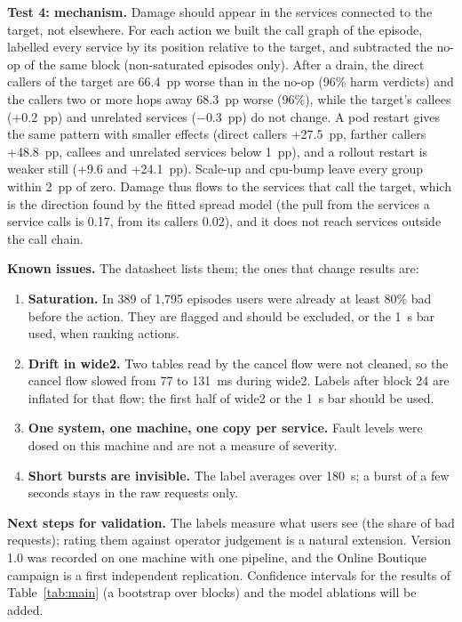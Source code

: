 \noindent\textbf{Test 4: mechanism.} Damage should appear in the services connected to the target, not elsewhere. For each action we built the call graph of the episode, labelled every service by its position relative to the target, and subtracted the no-op of the same block (non-saturated episodes only). After a drain, the direct callers of the target are 66.4~pp worse than in the no-op (96\% harm verdicts) and the callers two or more hops away 68.3~pp worse (96\%), while the target's callees (+0.2~pp) and unrelated services ($-0.3$~pp) do not change. A pod restart gives the same pattern with smaller effects (direct callers +27.5~pp, farther callers +48.8~pp, callees and unrelated services below 1~pp), and a rollout restart is weaker still (+9.6 and +24.1~pp). Scale-up and cpu-bump leave every group within 2~pp of zero. Damage thus flows to the services that call the target, which is the direction found by the fitted spread model (the pull from the services a service calls is 0.17, from its callers 0.02), and it does not reach services outside the call chain.

\noindent\textbf{Known issues.} The datasheet lists them; the ones that change results are:
\begin{enumerate}
\item \textbf{Saturation.} In 389 of 1,795 episodes users were already at least 80\% bad before the action. They are flagged and should be excluded, or the 1~s bar used, when ranking actions.
\item \textbf{Drift in wide2.} Two tables read by the cancel flow were not cleaned, so the cancel flow slowed from 77 to 131~ms during wide2. Labels after block 24 are inflated for that flow; the first half of wide2 or the 1~s bar should be used.
\item \textbf{One system, one machine, one copy per service.} Fault levels were dosed on this machine and are not a measure of severity.
\item \textbf{Short bursts are invisible.} The label averages over 180~s; a burst of a few seconds stays in the raw requests only.
\end{enumerate}

\noindent\textbf{Next steps for validation.} The labels measure what users see (the share of bad requests); rating them against operator judgement is a natural extension. Version 1.0 was recorded on one machine with one pipeline, and the Online Boutique campaign is a first independent replication. Confidence intervals for the results of Table~\ref{tab:main} (a bootstrap over blocks) and the model ablations will be added.

